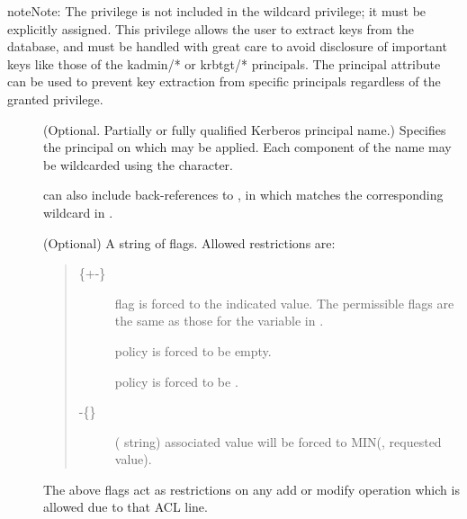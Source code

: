 \documentclass[letterpaper,10pt,english]{sphinxmanual}
\begin{document}
\begin{sphinxadmonition}{note}{Note:}
The  privilege is not included in the wildcard
privilege; it must be explicitly assigned.  This privilege
allows the user to extract keys from the database, and must be
handled with great care to avoid disclosure of important keys
like those of the kadmin/* or krbtgt/* principals.  The
 principal attribute can be used to prevent
key extraction from specific principals regardless of the
granted privilege.
\end{sphinxadmonition}
\begin{description}
\item[{}] \leavevmode
(Optional. Partially or fully qualified Kerberos principal name.)
Specifies the principal on which  may be applied.
Each component of the name may be wildcarded using the \sphinxcode{*}
character.

 can also include back-references to ,
in which  matches the corresponding wildcard in
.

\item[{}] \leavevmode
(Optional) A string of flags. Allowed restrictions are:
\begin{quote}
\begin{description}
\item[{\{+\textbar{}-\}}] \leavevmode
flag is forced to the indicated value.  The permissible flags
are the same as those for the 
variable in {\hyperref[\detokenize{admin/conf_files/kdc_conf:kdc-conf-5}]{}}.

\item[{}] \leavevmode
policy is forced to be empty.

\item[{}] \leavevmode
policy is forced to be .

\item[{-\{\} }] \leavevmode
( string) associated value will be forced to
MIN(, requested value).

\end{description}
\end{quote}

The above flags act as restrictions on any add or modify operation
which is allowed due to that ACL line.

\end{description}
\end{document}
